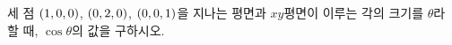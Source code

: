 세 점 $(1{,}\mkern3mu\mathopen{}0{,}\mkern3mu\mathopen{}0)$, $(0{,}\mkern3mu\mathopen{}2{,}\mkern3mu\mathopen{}0)$, $(0{,}\mkern3mu\mathopen{}0{,}\mkern3mu\mathopen{}1)$을 지나는 평면과 $xy$평면이 이루는 각의 크기를 $\theta$라 할 때, $\cos\theta$의 값을 구하시오.
